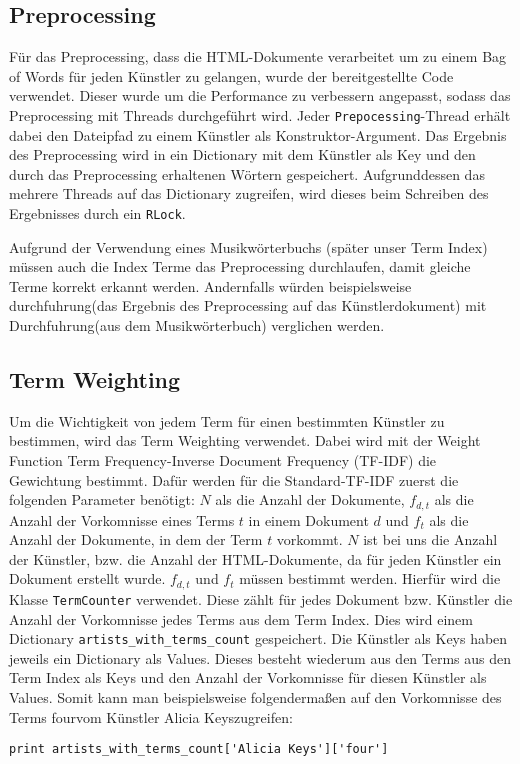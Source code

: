 \documentclass[prodmode,acmtecs]{acmsmall} %
\begin{document}
\subsection{Preprocessing}
Für das Preprocessing, dass die HTML-Dokumente verarbeitet um zu einem Bag of Words für jeden Künstler zu gelangen, wurde der bereitgestellte Code verwendet. Dieser wurde um die Performance zu verbessern angepasst, sodass das Preprocessing mit Threads durchgeführt wird. Jeder \texttt{Prepocessing}-Thread erhält dabei den Dateipfad zu einem Künstler als Konstruktor-Argument. Das Ergebnis des Preprocessing wird in ein Dictionary mit dem Künstler als Key und den durch das Preprocessing erhaltenen Wörtern gespeichert. Aufgrunddessen das mehrere Threads auf das Dictionary zugreifen, wird dieses beim Schreiben des Ergebnisses durch ein \texttt{RLock}.

Aufgrund der Verwendung eines Musikwörterbuchs (später unser Term Index) müssen auch die Index Terme das Preprocessing durchlaufen, damit gleiche Terme korrekt erkannt werden. Andernfalls würden beispielsweise \glqq durchfuhrung\grqq (das Ergebnis des Preprocessing auf das Künstlerdokument) mit \glqq Durchfuhrung\grqq (aus dem Musikwörterbuch) verglichen werden.

\subsection{Term Weighting}
Um die Wichtigkeit von jedem Term für einen bestimmten Künstler zu bestimmen, wird das Term Weighting verwendet. Dabei wird mit der Weight Function Term Frequency-Inverse Document Frequency (TF-IDF) die Gewichtung bestimmt. Dafür werden für die Standard-TF-IDF zuerst die folgenden Parameter benötigt: $N$ als die Anzahl der Dokumente, $f_{d,t}$ als die Anzahl der Vorkomnisse eines Terms $t$ in einem Dokument $d$ und $f_t$ als die Anzahl der Dokumente, in dem der Term $t$ vorkommt. 
$N$ ist bei uns die Anzahl der Künstler, bzw. die Anzahl der HTML-Dokumente, da für jeden Künstler ein Dokument erstellt wurde. $f_{d,t}$ und $f_t$ müssen bestimmt werden. Hierfür wird die Klasse \texttt{TermCounter} verwendet. Diese zählt für jedes Dokument bzw. Künstler die Anzahl der  Vorkomnisse jedes Terms aus dem Term Index. Dies wird einem Dictionary \texttt{artists\_with\_terms\_count} gespeichert. Die Künstler als Keys haben jeweils ein Dictionary als Values. Dieses besteht wiederum aus den Terms aus den Term Index als Keys und den Anzahl der Vorkomnisse für diesen Künstler als Values. 
Somit kann man beispielsweise folgendermaßen auf den Vorkomnisse des Terms \glqq four\grqq vom Künstler \glqq Alicia Keys\grqq zugreifen:
\begin{lstlisting}[]
    print artists_with_terms_count['Alicia Keys']['four']
\end{lstlisting}
\end{document}
